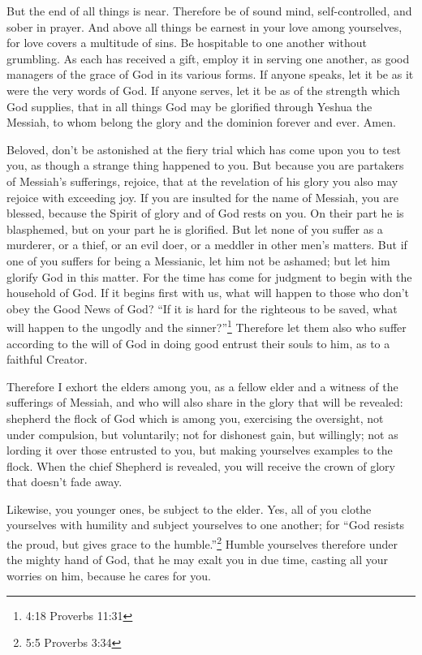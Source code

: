 \myverse{}But the end of all things is near. Therefore be of sound mind, self-controlled, and sober in prayer. \myverse{}And above all things be earnest in your love among yourselves, for love covers a multitude of sins. \myverse{}Be hospitable to one another without grumbling. \myverse{}As each has received a gift, employ it in serving one another, as good managers of the grace of God in its various forms. \myverse{}If anyone speaks, let it be as it were the very words of God. If anyone serves, let it be as of the strength which God supplies, that in all things God may be glorified through Yeshua the Messiah, to whom belong the glory and the dominion forever and ever. Amen.


\myverse{}Beloved, don’t be astonished at the fiery trial which has come upon you to test you, as though a strange thing happened to you. \myverse{}But because you are partakers of Messiah’s sufferings, rejoice, that at the revelation of his glory you also may rejoice with exceeding joy. \myverse{}If you are insulted for the name of Messiah, you are blessed, because the Spirit of glory and of God rests on you. On their part he is blasphemed, but on your part he is glorified. \myverse{}But let none of you suffer as a murderer, or a thief, or an evil doer, or a meddler in other men’s matters. \myverse{}But if one of you suffers for being a Messianic, let him not be ashamed; but let him glorify God in this matter. \myverse{}For the time has come for judgment to begin with the household of God. If it begins first with us, what will happen to those who don’t obey the Good News of God? \myverse{}“If it is hard for the righteous to be saved, what will happen to the ungodly and the sinner?”\footnote{4:18 Proverbs 11:31} \myverse{}Therefore let them also who suffer according to the will of God in doing good entrust their souls to him, as to a faithful Creator.


\mychapter{} \myverse*{}Therefore I exhort the elders among you, as a fellow elder and a witness of the sufferings of Messiah, and who will also share in the glory that will be revealed: \myverse{}shepherd the flock of God which is among you, exercising the oversight, not under compulsion, but voluntarily; not for dishonest gain, but willingly; \myverse{}not as lording it over those entrusted to you, but making yourselves examples to the flock. \myverse{}When the chief Shepherd is revealed, you will receive the crown of glory that doesn’t fade away.


\myverse{}Likewise, you younger ones, be subject to the elder. Yes, all of you clothe yourselves with humility and subject yourselves to one another; for “God resists the proud, but gives grace to the humble.”\footnote{5:5 Proverbs 3:34} \myverse{}Humble yourselves therefore under the mighty hand of God, that he may exalt you in due time, \myverse{}casting all your worries on him, because he cares for you.


